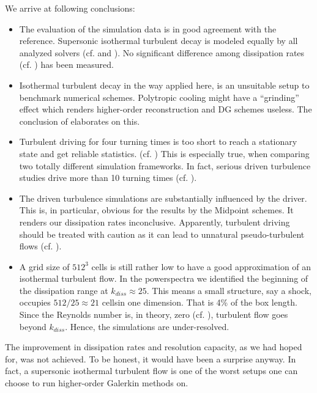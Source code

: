 We arrive at following conclusions:
\begin{itemize}
\item The evaluation of the simulation data is in good agreement with the
reference. Supersonic isothermal turbulent decay is modeled
equally by all analyzed solvers (cf.  and
). No significant difference among dissipation
rates (cf. ) has been measured.

\item Isothermal turbulent decay in the way applied here, is an unsuitable
setup to benchmark numerical schemes. Polytropic cooling might have a
``grinding'' effect which renders higher-order reconstruction and DG schemes
useless. The conclusion of  elaborates on this.

\item Turbulent driving for four turning times is too short to reach a
stationary state and get reliable statistics. (cf.
) This is especially true, when
comparing two totally different simulation frameworks. In fact, serious driven
turbulence studies drive more than 10 turning times (cf. \cite{konstandin2016mach}).

\item The driven turbulence simulations are substantially influenced by the
driver. This is, in particular, obvious for the results by the Midpoint
schemes. It renders our dissipation rates inconclusive. Apparently, turbulent
driving should be treated with caution as it can lead to unnatural
pseudo-turbulent flows (cf. ).

\item A grid size of $512^3$ cells is still rather low to have a good
approximation of an isothermal turbulent flow. In the powerspectra we
identified the beginning of the dissipation range at $k_{diss} \approx 25$.
This means a small structure, say a shock, occupies $512/25 \approx
21$ cells\footnotemark in one dimension. That is 4\% of the box length. Since
the Reynolds number is, in theory, zero (cf.  ), turbulent flow
goes beyond $k_{diss}$.  Hence, the simulations are under-resolved.
\end{itemize}

The improvement in dissipation rates and resolution capacity, as we had hoped
for, was not achieved. To be honest, it would have been a surprise anyway. In
fact, a supersonic isothermal turbulent flow is one of the worst setups one can
choose to run higher-order Galerkin methods on. 

